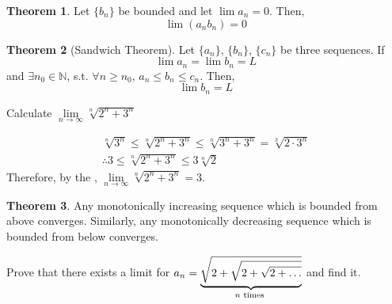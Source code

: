 \documentclass[fleqn, a4paper, 12pt, twoside]{article}
\theoremstyle{definition}
\theoremstyle{theorem}
\newtheorem{theorem}{Theorem}
\begin{document}
{\begin{theorem}
	Let $\{b_n\}$ be bounded and let $\lim a_n = 0$. Then,
	\begin{equation*}
		\lim (a_n b_n) = 0
	\end{equation*}
\end{theorem}

\begin{theorem}[Sandwich Theorem]
	Let $\{a_n\}$, $\{b_n\}$, $\{c_n\}$ be three sequences. If
	\begin{equation*}
		\lim a_n = \lim b_n = L
	\end{equation*}
	and $\exists n_0 \in \mathbb{N}$, s.t. $\forall n \geq n_0$, $a_n \leq b_n \leq c_n$.
	Then,
	\begin{equation*}
		\lim b_n = L
	\end{equation*}
	\label{sandwich theorem}
\end{theorem}

\begin{question}
	Calculate $\lim\limits_{n \to \infty} \sqrt[n]{2^n + 3^n}$
\end{question}

\begin{solution}[print]
	\begin{gather*}
		\sqrt[n]{3^n} \leq \sqrt[n]{2^n + 3^n} \leq \sqrt[n]{3^n + 3^n} = \sqrt[3]{2 \cdot 3^n}\\
		\therefore 3 \leq \sqrt[n]{2^n + 3^n} \leq 3 \sqrt[n]{2}
	\end{gather*}
	Therefore, by the , $\lim\limits_{n \to \infty} \sqrt[n]{2^n + 3^n} = 3$.
\end{solution}

\begin{theorem}
	Any monotonically increasing sequence which is bounded from above converges.
	Similarly, any monotonically decreasing sequence which is bounded from below converges.
	\label{monotonicity and boundedness implies convergence}
\end{theorem}

\begin{question}
	Prove that there exists a limit for $a_n = \underbrace{\sqrt{2 + \sqrt{2 + \sqrt{2 + \dots}}}}_{n \textnormal{ times }}$ and find it.
\end{question}

}
\end{document}
